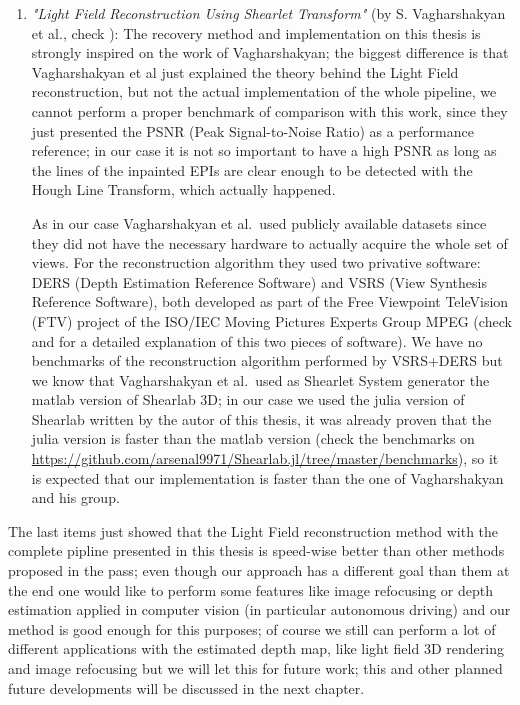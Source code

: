 \begin{enumerate}
\item \textit{"Light Field Reconstruction Using Shearlet Transform"} (by S. Vagharshakyan et al., check \cite{LF-Shearlets}): The recovery method and implementation on this thesis is strongly inspired on the work of Vagharshakyan; the biggest difference is that Vagharshakyan et al just explained the theory behind the Light Field reconstruction, but not the actual implementation of the whole pipeline, we cannot perform a proper benchmark of comparison with this work, since they just presented the PSNR (Peak Signal-to-Noise Ratio) as a performance reference; in our case it is not so important to have a high PSNR as long as the lines of the inpainted EPIs are clear enough to be detected with the Hough Line Transform, which actually happened.

As in our case Vagharshakyan et al.\ used publicly available datasets since they did not have the necessary hardware to actually acquire the whole set of views. For the reconstruction algorithm they used two privative software: DERS (Depth Estimation Reference Software) and VSRS (View Synthesis Reference Software), both developed as part of the Free Viewpoint TeleVision (FTV) project of the ISO/IEC Moving Pictures Experts Group MPEG (check \cite{DERS} and \cite{VSRS} for a detailed explanation of this two pieces of software). We have no benchmarks of the reconstruction algorithm performed by VSRS+DERS but we know that Vagharshakyan et al.\ used as Shearlet System generator the matlab version of Shearlab 3D; in our case we used the julia version of Shearlab written by the autor of this thesis, it was already proven that the julia version is faster than the matlab version (check the benchmarks on \url{https://github.com/arsenal9971/Shearlab.jl/tree/master/benchmarks}), so it is expected that our implementation is faster than the one of Vagharshakyan and his group. 
\end{enumerate}

The last items just showed that the Light Field reconstruction method with the complete pipline presented in this thesis is speed-wise better than other methods proposed in the pass; even though our approach has a different goal than them at the end one would like to perform some features like image refocusing or depth estimation applied in computer vision (in particular autonomous driving) and our method is good enough for this purposes; of course we still can perform a lot of different applications with the estimated depth map, like light field 3D rendering and image refocusing but we will let this for future work; this and other planned future developments will be discussed in the next chapter. 
